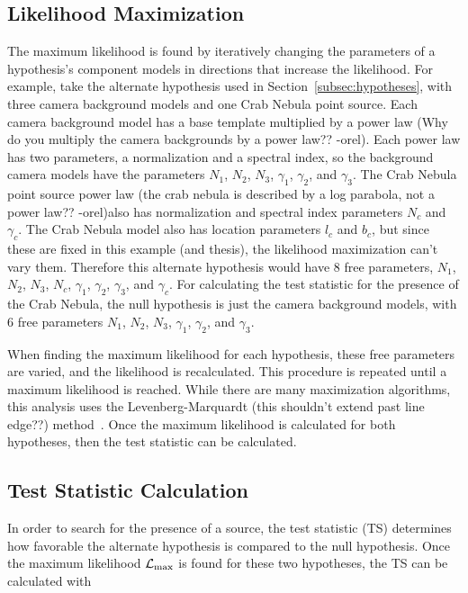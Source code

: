   \subsection{Likelihood Maximization}\label{subsec:likemax}
  The maximum likelihood is found by iteratively changing the parameters of a hypothesis's component models in directions that increase the likelihood.
  For example, take the alternate hypothesis used in Section~\ref{subsec:hypotheses}, with three camera background models and one Crab Nebula point source.
  Each camera background model has a base template multiplied by a power law {\color{red}(Why do you multiply the camera backgrounds by a power law?? -orel)}.
  Each power law has two parameters, a normalization and a spectral index, so the background camera models have the parameters $N_1$, $N_2$, $N_3$, $\gamma_1$, $\gamma_2$, and $\gamma_3$.
  The Crab Nebula point source power law {\color{red}(the crab nebula is described by a log parabola, not a power law?? -orel)}also has normalization and spectral index parameters $N_c$ and $\gamma_c$.
  The Crab Nebula model also has location parameters $l_c$ and $b_c$, but since these are fixed in this example (and thesis), the likelihood maximization can't vary them.
  Therefore this alternate hypothesis would have 8 free parameters, $N_1$, $N_2$, $N_3$, $N_c$, $\gamma_1$, $\gamma_2$, $\gamma_3$, and $\gamma_c$.
  For calculating the test statistic for the presence of the Crab Nebula, the null hypothesis is just the camera background models, with 6 free parameters $N_1$, $N_2$, $N_3$, $\gamma_1$, $\gamma_2$, and $\gamma_3$.
  
  When finding the maximum likelihood for each hypothesis, these free parameters are varied, and the likelihood is recalculated.
  This procedure is repeated until a maximum likelihood is reached.
  While there are many maximization algorithms, this analysis uses the {\color{red}Levenberg-Marquardt (this shouldn't extend past line edge??)} method~\cite{marquardt1963algorithm}.
  Once the maximum likelihood is calculated for both hypotheses, then the test statistic can be calculated.
  
  \subsection{Test Statistic Calculation}
  
  In order to search for the presence of a source, the test statistic (TS) determines how favorable the alternate hypothesis is compared to the null hypothesis.
  Once the maximum likelihood $\mathcal{L}_{\textrm{max}}$ is found for these two hypotheses, the TS can be calculated with
  

